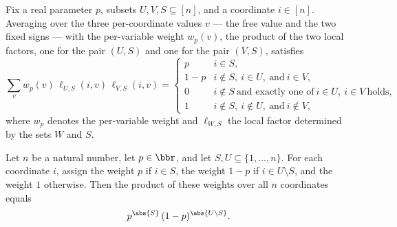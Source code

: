 \begin{lemma}
\label{RestrictionFourier.sum_varWeight_localFactor_mul}
\leanok
{}
Fix a real parameter $p$, subsets $U, V, S \subseteq [n]$, and a coordinate $i \in [n]$.
Averaging over the three per-coordinate values $v$ — the free value and the two fixed
signs — with the per-variable weight $w_p(v)$, the product of the two local factors, one
for the pair $(U,S)$ and one for the pair $(V,S)$, satisfies
\[
  \sum_{v} w_p(v)\,\ell_{U,S}(i,v)\,\ell_{V,S}(i,v)
  = \begin{cases}
      p & i \in S,\\[2pt]
      1-p & i \notin S,\ i \in U,\ \text{and}\ i \in V,\\[2pt]
      0 & i \notin S\ \text{and exactly one of}\ i \in U,\ i \in V\ \text{holds},\\[2pt]
      1 & i \notin S,\ i \notin U,\ \text{and}\ i \notin V,
    \end{cases}
\]
where $w_p$ denotes the per-variable weight and $\ell_{W,S}$ the local factor determined
by the sets $W$ and $S$.
\end{lemma}

\begin{lemma}
\label{RestrictionFourier.prod_if_subset}
\leanok
{}
Let $n$ be a natural number, let $p \in \bbr$, and let $S, U \subseteq \{1, \dots, n\}$.
For each coordinate $i$, assign the weight $p$ if $i \in S$, the weight $1 - p$ if $i
\in U \setminus S$, and the weight $1$ otherwise. Then the product of these weights over
all $n$ coordinates equals
\[
  p^{\abs{S}}\,(1-p)^{\abs{U \setminus S}}.
\]
\end{lemma}

